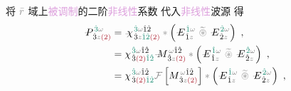 将 $\mathcolor{gray}{\bar{r}}$ 域上\textcolor{Plum}{被调制}的二阶\textcolor{Plum}{非线性}系数  代入\textcolor{Plum}{非线性}\textcolor{NavyBlue}{波源}  得
\begin{subequations} \label{eq:DP^(2)-3_12-spectrum-C}
\begin{align}
	\Xint{\mathcolor{gray}{-}}{30}{P}^{\;\! \textcolor{PineGreen}{\hat{3}} \mathcolor{gray}{\omega} }_{\;\! \hat{3}\mathcolor{gray}{z} \textcolor{Maroon}{(2)} } &= \Xint{{}^{}_{\mathcolor{gray}{-}}}{23}{\chi}^{\;\! \textcolor{PineGreen}{\hat{3}} \mathcolor{gray}{\omega} \hat{1} \hat{2} }_{\;\! \hat{3} \mathcolor{gray}{z} \textcolor{PineGreen}{\hat{1} \hat{2}} \textcolor{Maroon}{(2)}} \mathcolor{gray}{*} \left( \Xint{\mathcolor{gray}{-}}{295}{E}^{\;\!\textcolor{PineGreen}{\hat{1}} \mathcolor{gray}{\omega}}_{\;\! \hat{1} \mathcolor{gray}{z}} ~\mathcolor{gray}{\widetilde \circledast}~ \Xint{\mathcolor{gray}{-}}{295}{E}^{\;\!\textcolor{PineGreen}{\hat{2}} \mathcolor{gray}{\omega}}_{\;\! \hat{2} \mathcolor{gray}{z}} \right) ~, \label{eq:DP^(2)-3_12-spectrum-C1} \\
	&= {\chi}^{\;\! \textcolor{PineGreen}{\hat{3}} \mathcolor{gray}{\omega} \hat{1} \hat{2} }_{\;\! \hat{3} \textcolor{Maroon}{(2)} \textcolor{PineGreen}{\hat{1} \hat{2}}} \Xint{\mathcolor{gray}{-}}{18}{M}^{\;\! \mathcolor{gray}{\omega} \hat{1} \hat{2} }_{\;\! \hat{3} \mathcolor{gray}{z} \textcolor{Maroon}{(2)} } \mathcolor{gray}{*} \left( \Xint{\mathcolor{gray}{-}}{295}{E}^{\;\!\textcolor{PineGreen}{\hat{1}} \mathcolor{gray}{\omega}}_{\;\! \hat{1} \mathcolor{gray}{z}} ~\mathcolor{gray}{\widetilde \circledast}~ \Xint{\mathcolor{gray}{-}}{295}{E}^{\;\!\textcolor{PineGreen}{\hat{2}} \mathcolor{gray}{\omega}}_{\;\! \hat{2} \mathcolor{gray}{z}} \right) ~, \label{eq:DP^(2)-3_12-spectrum-C2} \\
	&= {\chi}^{\;\! \textcolor{PineGreen}{\hat{3}} \mathcolor{gray}{\omega} \hat{1} \hat{2} }_{\;\! \hat{3} \textcolor{Maroon}{(2)} \textcolor{PineGreen}{\hat{1} \hat{2}}} \mathcolor{gray}{\mathcal F} \left[ M^{\;\! \mathcolor{gray}{\omega} \hat{1} \hat{2} }_{\;\! \hat{3} \mathcolor{gray}{z} \textcolor{Maroon}{(2)} } \right] \mathcolor{gray}{*} \left( \Xint{\mathcolor{gray}{-}}{295}{E}^{\;\!\textcolor{PineGreen}{\hat{1}} \mathcolor{gray}{\omega}}_{\;\! \hat{1} \mathcolor{gray}{z}} ~\mathcolor{gray}{\widetilde \circledast}~ \Xint{\mathcolor{gray}{-}}{295}{E}^{\;\!\textcolor{PineGreen}{\hat{2}} \mathcolor{gray}{\omega}}_{\;\! \hat{2} \mathcolor{gray}{z}} \right) ~, \label{eq:DP^(2)-3_12-spectrum-C3} \\

\end{align}
\end{subequations}
